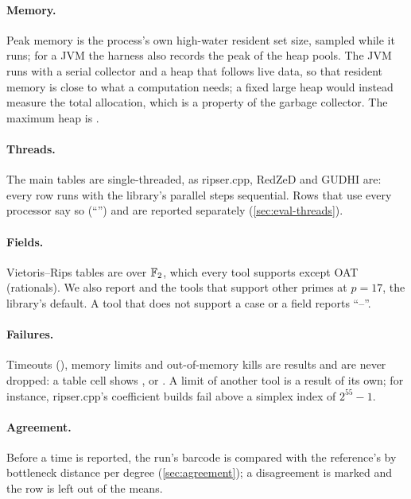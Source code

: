 \paragraph{Memory.}
Peak memory is the process's own high-water resident set size, sampled while it runs; for a JVM the harness also records the
peak of the heap pools. The JVM runs with a serial collector and a heap that follows live data, so that resident memory is
close to what a computation needs; a fixed large heap would instead measure the total allocation, which is a property of the
garbage collector. The maximum heap is .

\paragraph{Threads.}
The main tables are single-threaded, as ripser.cpp, RedZeD and GUDHI are: every \tdaj{} row runs with the library's parallel
steps sequential. Rows that use every processor say so (``'') and are reported separately
(\cref{sec:eval-threads}).

\paragraph{Fields.}
Vietoris--Rips tables are over $\mathbb{F}_2$, which every tool supports except OAT (rationals). We also report \tdaj{} and the tools that
support other primes at $p=17$, the library's default. A tool that does not support a case or a field reports ``--''.

\paragraph{Failures.}
Timeouts (), memory limits and out-of-memory kills are results and are never dropped: a table cell shows
,  or . A limit of another tool is a result of its own; for instance, ripser.cpp's
coefficient builds fail above a simplex index of $2^{55}-1$.

\paragraph{Agreement.}
Before a time is reported, the run's barcode is compared with the reference's by bottleneck distance per degree
(\cref{sec:agreement}); a disagreement is marked and the row is left out of the means.

